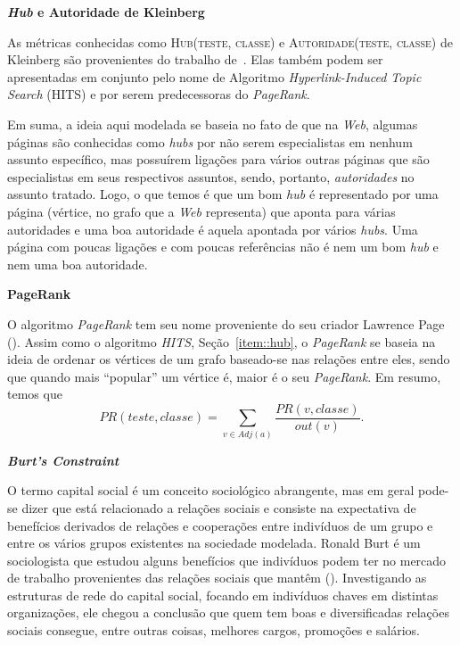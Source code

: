 \begin{description}
\item{\textbf{\textit{Hub} e Autoridade de Kleinberg}}
\label{item::hub}

As métricas conhecidas como \textsc{Hub(teste, classe)} e \textsc{Autoridade(teste, classe)} de Kleinberg são provenientes do trabalho de~\cite{Kleinberg99}. Elas também podem ser apresentadas em conjunto pelo nome de Algoritmo \textit{Hyperlink-Induced Topic Search} (HITS) e por serem predecessoras do \textit{PageRank}.

Em suma, a ideia aqui modelada se baseia no fato de que na \textit{Web}, algumas páginas são conhecidas como \textit{hubs} por não serem especialistas em nenhum assunto específico, mas possuírem ligações para vários outras páginas que são especialistas em seus respectivos assuntos, sendo, portanto, \textit{autoridades} no assunto tratado. Logo, o que temos é que um bom \textit{hub} é representado por uma página (vértice, no grafo que a \textit{Web} representa) que aponta para várias autoridades e uma boa autoridade é aquela apontada por vários \textit{hubs}. Uma página com poucas ligações e com poucas referências não é nem um bom \textit{hub} e nem uma boa autoridade.

\item{\textbf{PageRank}}
\label{item::pagerank}

O algoritmo \textit{PageRank} tem seu nome proveniente do seu criador Lawrence Page (\cite{Page98}). Assim como o algoritmo \textit{HITS}, Seção~\ref{item::hub}, o \textit{PageRank} se baseia na ideia de ordenar os vértices de um grafo baseado-se nas relações entre eles, sendo que quando mais ``popular'' um vértice é, maior é o seu \textit{PageRank}. Em resumo, temos que
\begin{equation}\label{eqn::pagerank}
PR(teste, classe) = \sum_{v \in Adj(a)} \frac{PR(v, classe)}{out(v)}.
\end{equation}

\item{\textbf{\textit{Burt's Constraint}}}
\label{item::constraint}

O termo capital social é um conceito sociológico abrangente, mas em geral pode-se dizer que está relacionado a relações sociais e consiste na expectativa de benefícios derivados de relações e cooperações entre indivíduos de um grupo e entre os vários grupos existentes na sociedade modelada. Ronald Burt é um sociologista que estudou alguns benefícios que indivíduos podem ter no mercado de trabalho provenientes das relações sociais que mantêm (\cite{Burt92}). Investigando as estruturas de rede do capital social, focando em indivíduos chaves em distintas organizações, ele chegou a conclusão que quem tem boas e diversificadas relações sociais consegue, entre outras coisas, melhores cargos, promoções e salários.  


\end{description}
